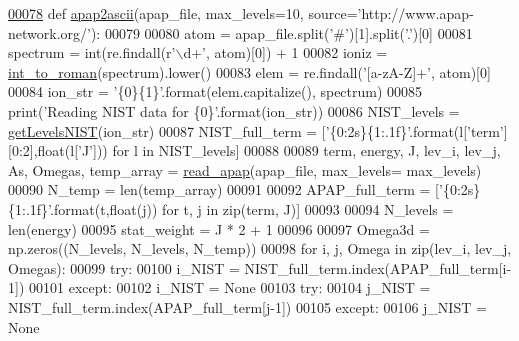 \begin{DoxyCode}
\hypertarget{namespacepyneb_1_1utils_1_1apap_l00078}{}\hyperlink{namespacepyneb_1_1utils_1_1apap_a4fccb2b8771d515b0be6f8a1921c0c58}{00078} \textcolor{keyword}{def }\hyperlink{namespacepyneb_1_1utils_1_1apap_a4fccb2b8771d515b0be6f8a1921c0c58}{apap2ascii}(apap\_file, max\_levels=10, source='http://www.apap-network.org/\textcolor{stringliteral}{'):}
00079 \textcolor{stringliteral}{    }
00080 \textcolor{stringliteral}{    atom = apap\_file.split(}\textcolor{stringliteral}{'#'})[1].split(\textcolor{stringliteral}{'.'})[0]
00081     spectrum = int(re.findall(\textcolor{stringliteral}{r'\(\backslash\)d+'}, atom)[0]) + 1
00082     ioniz = \hyperlink{namespacepyneb_1_1utils_1_1misc_aec4e973d4cb9299f749ef190ea636a06}{int\_to\_roman}(spectrum).lower()
00083     elem = re.findall(\textcolor{stringliteral}{'[a-zA-Z]+'}, atom)[0]
00084     ion\_str = \textcolor{stringliteral}{'\{0\}\{1\}'}.format(elem.capitalize(), spectrum)
00085     print(\textcolor{stringliteral}{'Reading NIST data for \{0\}'}.format(ion\_str))
00086     NIST\_levels = \hyperlink{namespacepyneb_1_1utils_1_1manage__atomic__data_ad09376e8676854d44680ae14210b5589}{getLevelsNIST}(ion\_str)
00087     NIST\_full\_term = [\textcolor{stringliteral}{'\{0:2s\}\{1:.1f\}'}.format(l[\textcolor{stringliteral}{'term'}][0:2],float(l[\textcolor{stringliteral}{'J'}])) \textcolor{keywordflow}{for} l \textcolor{keywordflow}{in}  NIST\_levels]
00088     
00089     term, energy, J, lev\_i, lev\_j, As, Omegas, temp\_array = \hyperlink{namespacepyneb_1_1utils_1_1apap_ad24a246526c0913b752319c5a2846412}{read\_apap}(apap\_file, max\_levels=
      max\_levels)
00090     N\_temp = len(temp\_array)
00091 
00092     APAP\_full\_term = [\textcolor{stringliteral}{'\{0:2s\}\{1:.1f\}'}.format(t,float(j)) \textcolor{keywordflow}{for} t, j \textcolor{keywordflow}{in} zip(term, J)]
00093     
00094     N\_levels = len(energy)
00095     stat\_weight = J * 2 + 1
00096         
00097     Omega3d = np.zeros((N\_levels, N\_levels, N\_temp))
00098     \textcolor{keywordflow}{for} i, j, Omega \textcolor{keywordflow}{in} zip(lev\_i, lev\_j, Omegas):
00099         \textcolor{keywordflow}{try}:
00100             i\_NIST = NIST\_full\_term.index(APAP\_full\_term[i-1])
00101         \textcolor{keywordflow}{except}:
00102             i\_NIST = \textcolor{keywordtype}{None}
00103         \textcolor{keywordflow}{try}:
00104             j\_NIST = NIST\_full\_term.index(APAP\_full\_term[j-1])
00105         \textcolor{keywordflow}{except}:
00106             j\_NIST = \textcolor{keywordtype}{None}

\end{DoxyCode}
